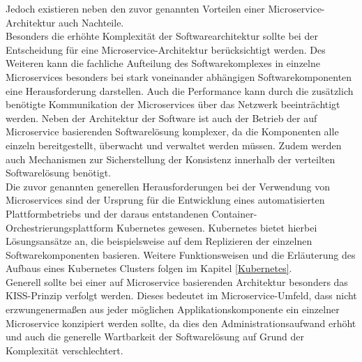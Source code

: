 \newpage
Jedoch existieren neben den zuvor genannten Vorteilen einer Microservice-Architektur auch Nachteile.\\
Besonders die erhöhte Komplexität der Softwarearchitektur sollte bei der Entscheidung für eine Microservice-Architektur berücksichtigt werden. Des Weiteren kann die fachliche Aufteilung des Softwarekomplexes in einzelne Microservices besonders bei stark voneinander abhängigen Softwarekomponenten eine Herausforderung darstellen. Auch die Performance kann durch die zusätzlich benötigte Kommunikation der Microservices über das Netzwerk beeinträchtigt werden. Neben der Architektur der Software ist auch der Betrieb der auf Microservice basierenden Softwarelösung komplexer, da die Komponenten alle einzeln bereitgestellt, überwacht und verwaltet werden müssen. Zudem werden auch Mechanismen zur Sicherstellung der Konsistenz innerhalb der verteilten Softwarelösung benötigt.\autocite[Vgl.][S. 73-77]{Wolff.2016} \\
Die zuvor genannten generellen Herausforderungen bei der Verwendung von Microservices sind der Ursprung für die Entwicklung eines automatisierten Plattformbetriebs und der daraus entstandenen Container-Orchestrierungsplattform Kubernetes gewesen. Kubernetes bietet hierbei Lösungsansätze an, die beispielsweise auf dem Replizieren der einzelnen Softwarekomponenten basieren. Weitere Funktionsweisen und die Erläuterung des Aufbaus eines Kubernetes Clusters folgen im Kapitel \ref{Kubernetes}.\\
Generell sollte bei einer auf Microservice basierenden Architektur besonders das \ac{KISS}-Prinzip verfolgt werden. Dieses bedeutet im Microservice-Umfeld, dass nicht erzwungenermaßen aus jeder möglichen Applikationskomponente ein einzelner Microservice konzipiert werden sollte, da dies den Administrationsaufwand erhöht und auch die generelle Wartbarkeit der Softwarelösung auf Grund der Komplexität verschlechtert.\autocite[Vgl.][S. 60]{Liebel.2019} \\

